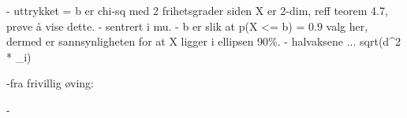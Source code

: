 - uttrykket = b er chi-sq med 2 frihetsgrader siden X er 2-dim, reff teorem 4.7, prøve å vise dette. 
- sentrert i mu.
- b er slik at p(X <= b) = 0.9 valg her, dermed er sannsynligheten for at X ligger i ellipsen 90\%. 
- halvaksene ... sqrt(d^2 * \lambda_i) 


-fra frivillig øving: 

- 